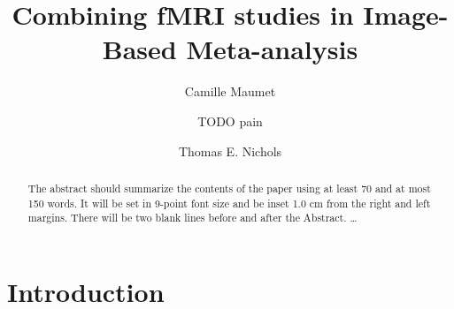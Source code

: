 \documentclass{llncs}
\newcommand{\effectvector}{Y}
\newcommand{\effect}[1][i]{\effectvector_{#1}}
\newcommand{\vareffect}[1][i]{V_{\effect[#1]}}
\newcommand{\zeffect}[1][i]{Z_{#1}}
\begin{document}
%
\frontmatter          %
%
\pagestyle{headings}  %
%
%
\mainmatter              %
%
\title{Combining fMRI studies in Image-Based Meta-analysis}

%
%
\author{Camille Maumet \and TODO pain
\and Thomas E. Nichols}
%
%
%

\maketitle              %

\begin{abstract}
The abstract should summarize the contents of the paper
using at least 70 and at most 150 words. It will be set in 9-point
font size and be inset 1.0 cm from the right and left margins.
There will be two blank lines before and after the Abstract. \dots
{}
\end{abstract}
%
\section{Introduction}


\end{document}
